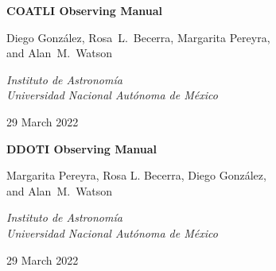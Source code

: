 
\pagestyle{empty}

\begin{centering}

\ifcoatli
\bigskip
\bigskip
\bigskip
\bigskip
{
 \Large
 \bfseries 
 COATLI Observing Manual
 \par
}
\bigskip
{
\baselineskip=10pt
 \large
 Diego González,
 Rosa~L.~Becerra,
 Margarita Pereyra,\\
 and
 Alan~M.~Watson
 \par
}
\bigskip
{
 \large
 \itshape 
 Instituto de Astronomía\\
 Universidad Nacional Autónoma de México
 \par
}
\bigskip
{
 \large
 29 March 2022
}
\fi

\ifddoti
\bigskip
\bigskip
\bigskip
\bigskip
{
 \Large
 \bfseries 
 DDOTI Observing Manual
 \par
}
\bigskip
{
\baselineskip=10pt
 \large
 Margarita Pereyra,
 Rosa L. Becerra,
 Diego González,\\
 and
 Alan~M.~Watson
 \par
}
\bigskip
{
 \large
 \itshape 
 Instituto de Astronomía\\
 Universidad Nacional Autónoma de México
 \par
}
\bigskip
{
 \large
 29 March 2022
}
\fi

\end{centering}

\newpage

\pagestyle{plain}


\tableofcontents

